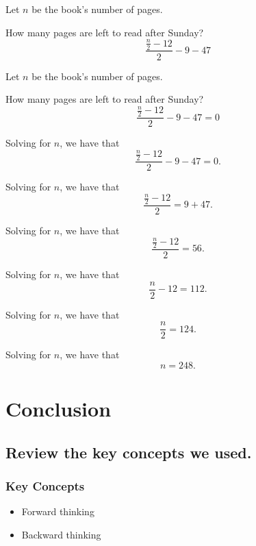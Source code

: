 \documentclass{beamer} %
\begin{document}
\begin{frame}
Let $n$ be the book's number of pages.

How many pages are left to read after Sunday?
\[
\frac{\frac{n}{2}-12}{2}-9-47
\]
\end{frame}

\begin{frame}
Let $n$ be the book's number of pages.

How many pages are left to read after Sunday?
\[
\frac{\frac{n}{2}-12}{2}-9-47 = 0
\]
\end{frame}

\begin{frame}
Solving for $n$, we have that
\[
\frac{\frac{n}{2}-12}{2}-9-47 = 0.
\]
\end{frame}

\begin{frame}
Solving for $n$, we have that
\[
\frac{\frac{n}{2}-12}{2} = 9+47.
\]
\end{frame}

\begin{frame}
Solving for $n$, we have that
\[
\frac{\frac{n}{2}-12}{2} = 56.
\]
\end{frame}

\begin{frame}
Solving for $n$, we have that
\[
\frac{n}{2}-12 = 112.
\]
\end{frame}

\begin{frame}
Solving for $n$, we have that
\[
\frac{n}{2} = 124.
\]
\end{frame}

\begin{frame}
Solving for $n$, we have that
\[
n = \boxed{248}.
\]
\end{frame}

\section{Conclusion}

\subsection*{Review the key concepts we used.}

\begin{frame}
  \frametitle{Key Concepts}
  \pause
  \begin{itemize}
  \item Forward thinking \pause
  \item Backward thinking
  \end{itemize}
\end{frame}
\end{document}
